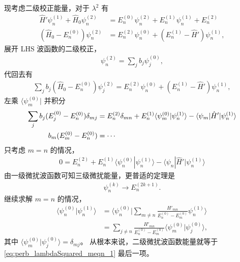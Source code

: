 现考虑二级校正能量，对于 $\lambda^2$ 有
\begin{align}
    \hat H' \psi_n^{(1)} + \hat H_0 \psi_n^{(2)} &= E_n^{(0)} \psi_n^{(2)} +E_n^{(1)} \psi_n^{(1)} + E_n^{(2)} \\
    (\hat H_0 - E_n^{(0)}) \psi_n^{(2)} &= E_n^{(2)} \psi_n^{(0)} + (E_n^{(1)} - \hat H') \psi_n^{(1)}, 
\end{align}
展开 LHS 波函数的二级校正，
\begin{align}
    \psi_n^{(2)} = \sum_j b_j \psi_j^{(0)},
\end{align}
代回去有
\begin{align}
    \sum_j b_j (\hat H_0 - E_n^{(0)}) \psi_j^{(2)} = E_n^{(2)} \psi_n^{(0)} + (E_n^{(1)} - \hat H') \psi_n^{(1)},
\end{align}
左乘 $\langle \psi_m^{(0)}|$ 并积分
\begin{align}
    \sum_j b_j (E_j^{(0)} - E_n^{(0)}) \delta_{mj} &= E_n^{(2)} \delta_{mn} + E_n^{(1)} \langle \psi_m^{(0)} | \psi_n^{(1)} \rangle - \langle \psi_m | \hat H' | \psi_n^{(1)} \rangle \notag \\
    b_m (E_m^{(0)} - E_n^{(0)}) &= \cdots
\end{align}
只考虑 $m=n$ 的情况，
\begin{align}
    0 = E_n^{(2)}  + E_n^{(1)} \langle \psi_n^{(0)} | \psi_n^{(1)} \rangle - \langle \psi_n | \hat H' | \psi_n^{(1)} \rangle
    \label{eq:perb_lambdaSquared_meqn_1}
\end{align}
由一级微扰波函数可知三级微扰能量，更普适的定理是
\begin{align}
    \psi_n^{(k)} \rightarrow E_n^{(2k+1)}. 
\end{align}
继续求解 $m=n$ 的情况，
\begin{align}
    \langle \psi_n^{(0)} | \psi_n^{(1)} \rangle
    & = \langle \psi_n^{(0)} | \sum_{m\neq n}\frac{H'_{mn}}{E_n^{(0)} - E_m^{(0)}} \psi_n^{(1)} \rangle \\
    & = \sum_{j\neq n}\frac{H'_{mn}}{E_n^{(0)} - E_m^{(0)}} \langle \psi_m^{(0)} | \psi_j^{(0)} \rangle, 
\end{align}
其中 $\langle \psi_m^{(0)} | \psi_j^{(0)} \rangle = \delta_{mj}$。
从根本来说，二级微扰波函数能量就等于 \eqref{eq:perb_lambdaSquared_meqn_1} 最后一项。

